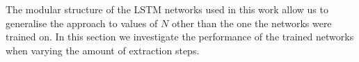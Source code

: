 The modular structure of the LSTM networks used in this work allow us to generalise the approach to values of $N$ other than the one the networks were trained on.
In this section we investigate the performance of the trained networks when varying the amount of extraction steps.